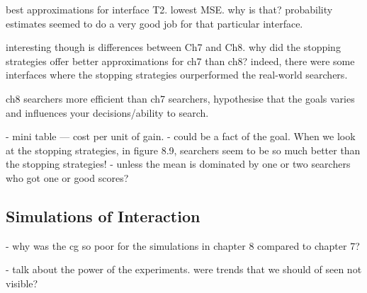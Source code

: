 best approximations for interface T2.
lowest MSE. why is that? probability estimates seemed to do a very good job for that particular interface.

interesting though is differences between Ch7 and Ch8.
why did the stopping strategies offer better approximations for ch7 than ch8? indeed, there were some interfaces where the stopping strategies ourperformed the real-world searchers.

ch8 searchers more efficient than ch7 searchers, hypothesise that the goals varies and influences your decisions/ability to search.

- mini table — cost per unit of gain.
		- could be a fact of the goal. When we look at the stopping strategies, in figure 8.9, searchers seem to be so much better than the stopping strategies!
		- unless the mean is dominated by one or two searchers who got one or good scores?

\subsection{Simulations of Interaction}

- why was the cg so poor for the simulations in chapter 8 compared to chapter 7?

- talk about the power of the experiments. were trends that we should of seen not visible?


